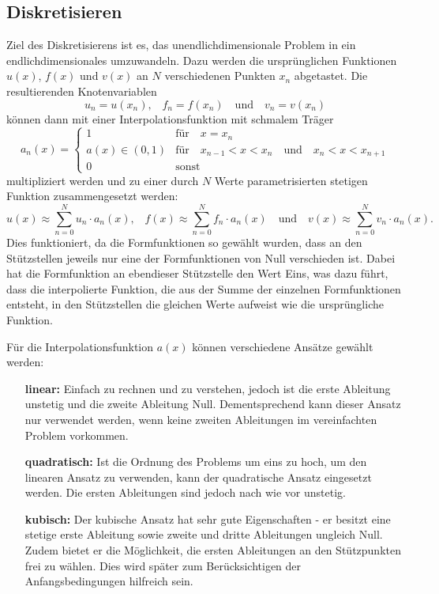 \subsection{Diskretisieren\label{fem:1d:diskretisieren}}
Ziel des Diskretisierens ist es, das unendlichdimensionale Problem in ein endlichdimensionales umzuwandeln.
Dazu werden die ursprünglichen Funktionen $u(x)$, $f(x)$ und $v(x)$ an $N$ verschiedenen Punkten $x_n$ abgetastet.
Die resultierenden Knotenvariablen
\begin{equation}
    u_n = u(x_n) 
    \text{,} \quad
    f_n = f(x_n)
    \quad \text{und} \quad
    v_n = v(x_n)
\end{equation}
können dann mit einer Interpolationsfunktion mit schmalem Träger
\begin{equation}
    a_n(x) = \left\{ \begin{array}{ll}
        1
            & \text{für} \quad x = x_n \\
        a(x) \in (0, 1) 
            & \text{für} \quad x_{n-1} < x < x_n \quad \text{und} \quad x_n < x < x_{n+1} \\
        0
            & \text{sonst} 
    \end{array} \right.
\end{equation}
multipliziert werden und zu einer durch $N$ Werte parametrisierten stetigen Funktion zusammengesetzt werden:
\begin{equation}
    u(x) \approx \sum_{n=0}^{N}{u_n \cdot a_n(x)} 
    \text{,} \quad
    f(x) \approx \sum_{n=0}^{N}{f_n \cdot a_n(x)} 
    \quad \text{und} \quad
    v(x) \approx \sum_{n=0}^{N}{v_n \cdot a_n(x)}.
\end{equation}
Dies funktioniert, da die Formfunktionen so gewählt wurden, dass an den Stützstellen jeweils nur eine der Formfunktionen von Null verschieden ist.
Dabei hat die Formfunktion an ebendieser Stützstelle den Wert Eins, was dazu führt, dass die interpolierte Funktion, die aus der Summe der einzelnen Formfunktionen entsteht, in den Stützstellen die gleichen Werte aufweist wie die ursprüngliche Funktion.

Für die Interpolationsfunktion $a(x)$ können verschiedene Ansätze gewählt werden:
\begin{itemize}
    \item[\textbf{linear:}] 
        Einfach zu rechnen und zu verstehen, jedoch ist die erste Ableitung unstetig und die zweite Ableitung Null.
        Dementsprechend kann dieser Ansatz nur verwendet werden, wenn keine zweiten Ableitungen im vereinfachten Problem vorkommen.
    \item[\textbf{quadratisch:}]
        Ist die Ordnung des Problems um eins zu hoch, um den linearen Ansatz zu verwenden, kann der quadratische Ansatz eingesetzt werden.
        Die ersten Ableitungen sind jedoch nach wie vor unstetig.
    \item[\textbf{kubisch:}]  
        Der kubische Ansatz hat sehr gute Eigenschaften - er besitzt eine stetige erste Ableitung sowie zweite und dritte Ableitungen ungleich Null. 
        Zudem bietet er die Möglichkeit, die ersten Ableitungen an den Stützpunkten frei zu wählen.
        Dies wird später zum Berücksichtigen der Anfangsbedingungen hilfreich sein.
\end{itemize}

